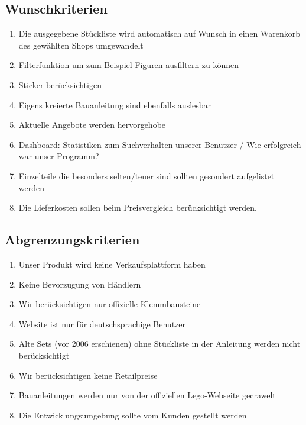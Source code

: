 \subsection{Wunschkriterien}
\begin{enumerate}
\item Die ausgegebene Stückliste wird automatisch auf Wunsch in einen Warenkorb des gewählten Shops umgewandelt
\item Filterfunktion um zum Beispiel Figuren ausfiltern zu können
\item Sticker berücksichtigen
\item Eigens kreierte Bauanleitung sind ebenfalls auslesbar
\item Aktuelle Angebote werden hervorgehobe
\item Dashboard: Statistiken zum Suchverhalten unserer Benutzer / Wie erfolgreich war unser Programm?
\item Einzelteile die besonders selten/teuer sind sollten gesondert aufgelistet werden
\item Die Lieferkosten sollen beim Preisvergleich berücksichtigt werden.
\end{enumerate}

\subsection{Abgrenzungskriterien}
\begin{enumerate}
\item Unser Produkt wird keine Verkaufsplattform haben
\item Keine Bevorzugung von Händlern
\item Wir berücksichtigen nur offizielle Klemmbausteine
\item Website ist nur für deutschsprachige Benutzer
\item Alte Sets (vor 2006 erschienen) ohne Stückliste in der Anleitung werden nicht berücksichtigt
\item Wir berücksichtigen keine Retailpreise
\item Bauanleitungen werden nur von der offiziellen Lego-Webseite gecrawelt
\item Die Entwicklungsumgebung sollte vom Kunden gestellt werden
\end{enumerate}

